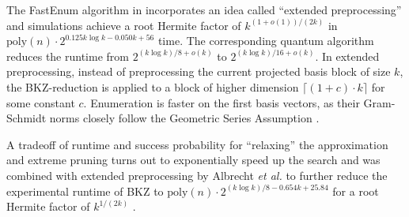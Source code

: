 The FastEnum algorithm in \citet{ABFKSW20} incorporates an idea called ``extended preprocessing'' and simulations achieve a root Hermite factor of $k^{(1 + o(1))/(2k)}$ in $\text{poly}(n) \cdot 2^{0.125k \log k - 0.050k + 56}$ time. The corresponding quantum algorithm reduces the runtime from $2^{(k \log k)/8 + o(k)}$ to $2^{(k \log k) / 16 + o(k)}$. In extended preprocessing, instead of preprocessing the current projected basis block of size $k$, the BKZ-reduction is applied to a block of higher dimension $\lceil (1+c)\cdot k\rceil$ for some constant $c$. Enumeration is faster on the first basis vectors, as their Gram-Schmidt norms closely follow the Geometric Series Assumption \cite{MW16}. %

A tradeoff of runtime and success probability for ``relaxing'' the approximation and extreme pruning turns out to exponentially speed up the search \cite{LN20} and was combined with extended preprocessing by Albrecht \textit{et al.} to further reduce the experimental runtime of BKZ to $\text{poly}(n) \cdot 2^{(k \log k)/8 - 0.654k + 25.84}$ for a root Hermite factor of $k^{1/(2k)}$ \cite{ABFKSW20}.






